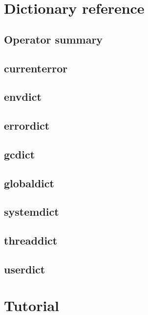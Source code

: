 \section{Dictionary reference}
\subsection{Operator summary}
\subsection{currenterror}
\subsection{envdict}
\subsection{errordict}
\subsection{gcdict}
\subsection{globaldict}
\subsection{systemdict}
\subsection{threaddict}
\subsection{userdict}

\section{Tutorial}
